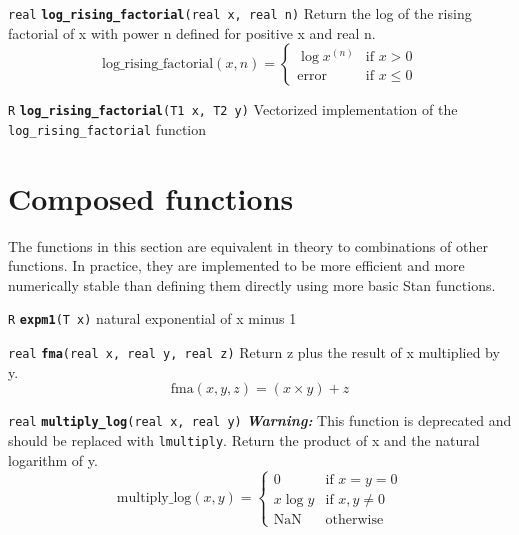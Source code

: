 \documentclass[
  10pt,
]{book}
\begin{document}

\texttt{real} \textbf{\texttt{log\_rising\_factorial}}\texttt{(real\ x,\ real\ n)}\newline
Return the log of the rising factorial of x with power n defined for
positive x and real n.~\[ \mathrm{log\_rising\_factorial}(x,n) =
\begin{cases} \log x^{(n)} & \text{if } x > 0 \\ \textrm{error} &
\text{if } x \leq 0 \end{cases} \]


\texttt{R} \textbf{\texttt{log\_rising\_factorial}}\texttt{(T1\ x,\ T2\ y)}\newline
Vectorized implementation of the \texttt{log\_rising\_factorial} function

\hypertarget{composed-functions}{%
\section{Composed functions}\label{composed-functions}}

The functions in this section are equivalent in theory to combinations
of other functions. In practice, they are implemented to be more
efficient and more numerically stable than defining them directly
using more basic Stan functions.


\texttt{R} \textbf{\texttt{expm1}}\texttt{(T\ x)}\newline
natural exponential of x minus 1


\texttt{real} \textbf{\texttt{fma}}\texttt{(real\ x,\ real\ y,\ real\ z)}\newline
Return z plus the result of x multiplied by y. \[ \text{fma}(x,y,z) =
(x \times y) + z \]


\texttt{real} \textbf{\texttt{multiply\_log}}\texttt{(real\ x,\ real\ y)}\newline
\emph{\textbf{Warning:}} This function is deprecated and should be replaced with
\texttt{lmultiply}. Return the product of x and the natural logarithm of y.
\[ \mathrm{multiply\_log}(x,y) = \begin{cases} 0 & \text{if } x = y =
0 \\ x \log y & \text{if } x, y \neq 0 \\ \text{NaN} &
\text{otherwise} \end{cases} \]
\end{document}

